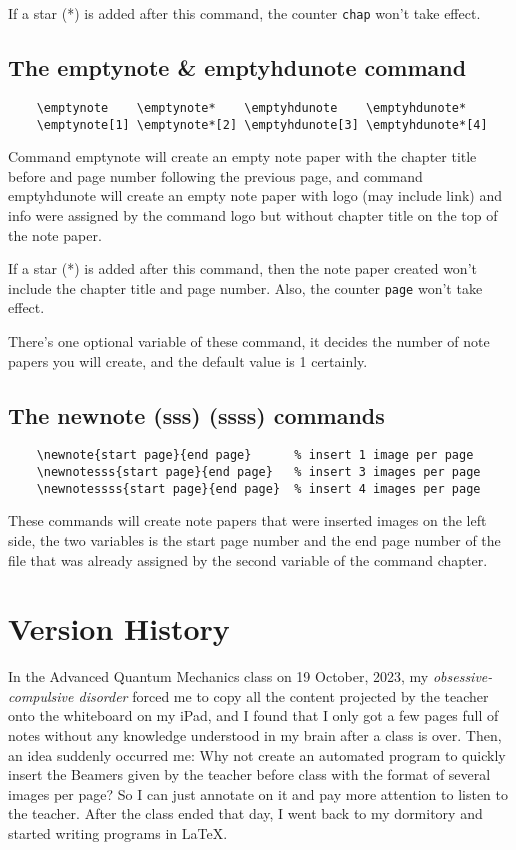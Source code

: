 \documentclass[11pt]{article}
\def\cmd#1{\texorpdfstring{\textcolor{cmdcolor}{\textsf{#1}}}{“#1”}}
\begin{document}
If a star (*) is added after this command, the counter \verb|chap| won't take effect.

\subsection{The \cmd{emptynote} \& \cmd{emptyhdunote} command}
\begin{verbatim}
    \emptynote    \emptynote*    \emptyhdunote    \emptyhdunote*
    \emptynote[1] \emptynote*[2] \emptyhdunote[3] \emptyhdunote*[4]
\end{verbatim}

Command \cmd{emptynote} will create an empty note paper with the chapter title before and page number following the previous page, and command \cmd{emptyhdunote} will create an empty note paper with logo (may include link) and info were assigned by the command \cmd{logo} but without chapter title on the top of the note paper.

If a star (*) is added after this command, then the note paper created won't include the chapter title and page number. Also, the counter \verb|page| won't take effect.

There's one optional variable of these command, it decides the number of note papers you will create, and the default value is 1 certainly.

\subsection{The \cmd{newnote (sss) (ssss)} commands}
\begin{verbatim}
    \newnote{start page}{end page}      % insert 1 image per page
    \newnotesss{start page}{end page}   % insert 3 images per page
    \newnotessss{start page}{end page}  % insert 4 images per page
\end{verbatim}

These commands will create note papers that were inserted images on the left side, the two variables is the start page number and the end page number of the file that was already assigned by the second variable of the command \cmd{chapter}.

\section{Version History}

In the Advanced Quantum Mechanics class on 19 October, 2023, my \emph{obsessive-compulsive disorder} forced me to copy all the content projected by the teacher onto the whiteboard on my iPad, and I found that I only got a few pages full of notes without any knowledge understood in my brain after a class is over. Then, an idea suddenly occurred me: Why not create an automated program to quickly insert the Beamers given by the teacher before class with the format of several images per page? So I can just annotate on it and pay more attention to listen to the teacher. After the class ended that day, I went back to my dormitory and started writing programs in \textsf\LaTeX{}.
\end{document}
